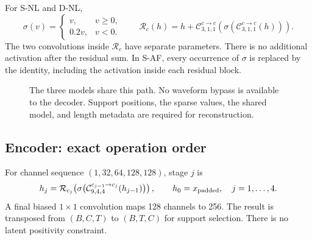 \documentclass[11pt,a4paper]{article}
\newcommand{\R}{\mathbb{R}}
\begin{document}
For S-NL and D-NL,
\begin{equation}
 \sigma(v)=\begin{cases}v,&v\geq0,\\0.2v,&v<0.\end{cases}
 \qquad
 \mathcal R_c(h)=h+\mathcal C^{c\to c}_{3,1,1}\!\left(
 \sigma\!\left(\mathcal C^{c\to c}_{3,1,1}(h)\right)\right).
 \label{eq:residual}
\end{equation}
The two convolutions inside $\mathcal R_c$ have separate parameters. There is no additional activation after the residual sum. In S-AF, every occurrence of $\sigma$ is replaced by the identity, including the activation inside each residual block.

\begin{figure}[htbp]
\centering
{}
\caption{The three models share this path. No waveform bypass is available to the decoder. Support positions, the sparse values, the shared model, and length metadata are required for reconstruction.}
\end{figure}

\subsection{Encoder: exact operation order}
For channel sequence $(1,32,64,128,128)$, stage $j$ is
\begin{equation}
 h_j=\mathcal R_{c_j}\!\left(\sigma\!\left(\mathcal C^{c_{j-1}\to c_j}_{9,4,4}(h_{j-1})\right)\right),
 \qquad h_0=x_{\rm padded},\quad j=1,\ldots,4.
\end{equation}
A final biased $1\times1$ convolution maps 128 channels to 256. The result is transposed from $(B,C,T)$ to $(B,T,C)$ for support selection. There is no latent positivity constraint.
\end{document}
